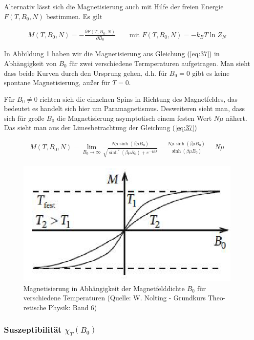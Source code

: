 Alternativ lässt sich die Magnetisierung auch mit Hilfe der freien Energie \(F(T,B_0,N)\) bestimmen. Es gilt

\begin{align}
  \label{eq:41}
  M(T,B_0,N) = - \frac{\partial F(T,B_0,N)}{\partial B_0}\qquad \text{mit } F(T,B_0,N) = - k_B T \ln Z_N
\end{align}

In Abbildung \ref{fig:2} haben wir die Magnetisierung aus Gleichung (\ref{eq:37}) in Abhängigkeit von \(B_0\) für zwei verschiedene Termperaturen aufgetragen. Man sieht dass beide Kurven durch den Ursprung gehen, d.h. für \(B_0=0\) gibt es keine spontane Magnetisierung, außer für \(T=0\). 

Für \(B_0\ne 0\) richten sich die einzelnen Spins in Richtung des Magnetfeldes, das bedeutet es handelt sich hier um Paramagnetismus. Desweiteren sieht man, dass sich für große \(B_0\) die Magnetisierung asymptotisch einem festen Wert \(N\mu\)  nähert. Das sieht man aus der Limesbetrachtung der Gleichung (\ref{eq:37})

\begin{align}
  \label{eq:36}
  M(T,B_0,N) = \lim_{B_0\to\infty} \frac{ N \mu \sinh(\beta \mu B_0)}{\sqrt{\sinh^2(\beta \mu B_0) + e^{-4\beta J}   }} = \frac{ N \mu \sinh(\beta \mu B_0)}{\sinh(\beta \mu B_0)} = N\mu
\end{align}

\begin{figure}
  \centering
  \includegraphics[scale=0.5]{./ising-pics/ising02.png}
  \caption{Magnetisierung in Abhängigkeit der Magnetfelddichte $B_0$ für verschiedene Temperaturen (Quelle: W. Nolting - Grundkurs Theo-
retische Physik: Band 6)
}
  \label{fig:2}
\end{figure}

\subsubsection*{Suszeptibilität $\chi_T(B_0)$}

